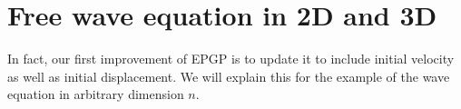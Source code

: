 \documentclass{article} %
\theoremstyle{plain}
\theoremstyle{definition}
\theoremstyle{remark}
\DeclareMathOperator{\rank}{rank}
\newcommand{\CC}{\mathbb{C}}
\begin{document}


\section{Free wave equation in 2D and 3D} \label{sec:free_wave}

In fact, our first improvement of EPGP is to update it to include initial velocity as well as initial displacement. We will explain this for the example of the wave equation in arbitrary dimension $n$. 
\end{document}
